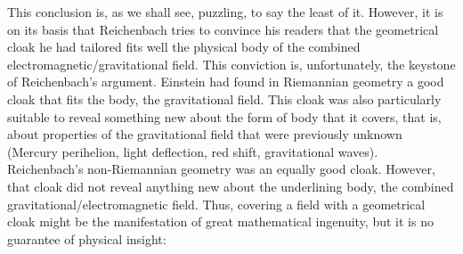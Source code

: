 \documentclass[submitted]{article}
\begin{document}
This conclusion is, as we shall see, puzzling, to say the least of it. However, it is on its basis that Reichenbach tries to convince his readers that the geometrical cloak he had tailored fits well the physical body of the combined electromagnetic/gravitational field. This conviction is, unfortunately, the keystone of Reichenbach's argument. Einstein had found in Riemannian geometry a good cloak that fits the body, the gravitational field. This cloak was also particularly suitable to reveal something new about the form of body that it covers, that is, about properties of the gravitational field that were previously unknown (Mercury perihelion, light deflection, red shift, gravitational waves\etc). Reichenbach's non-Riemannian geometry was an equally good cloak. However, that cloak did not reveal anything new about the underlining body, the combined gravitational/electromagnetic field. Thus, covering a field with a geometrical cloak might be the manifestation of great mathematical ingenuity, but it is no guarantee of physical insight:
\end{document}
